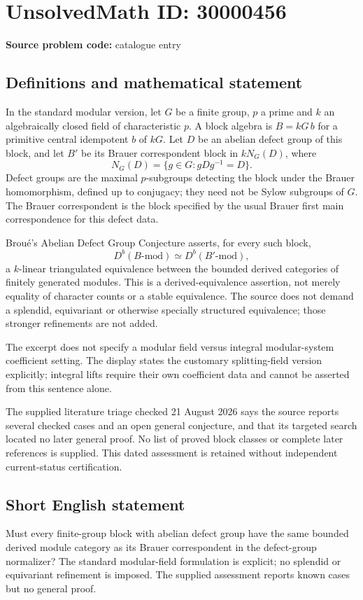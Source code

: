 \documentclass[11pt]{article}
\begin{document}
\section*{UnsolvedMath ID: 30000456}
\textbf{Source problem code:} catalogue entry
\subsection{Definitions and mathematical statement}
In the standard modular version, let $G$ be a finite group, $p$ a prime and $k$ an algebraically closed field of characteristic $p$. A block algebra is $B=kG\,b$ for a primitive central idempotent $b$ of $kG$. Let $D$ be an abelian defect group of this block, and let $B'$ be its Brauer correspondent block in $kN_G(D)$, where
\[
 N_G(D)=\{g\in G:gDg^{-1}=D\}.
\]
Defect groups are the maximal $p$-subgroups detecting the block under the Brauer homomorphism, defined up to conjugacy; they need not be Sylow subgroups of $G$. The Brauer correspondent is the block specified by the usual Brauer first main correspondence for this defect data.

Brou\'e's Abelian Defect Group Conjecture asserts, for every such block,
\[
 D^b(B\text{-}\mathrm{mod})\simeq D^b(B'\text{-}\mathrm{mod}),
\]
a $k$-linear triangulated equivalence between the bounded derived categories of finitely generated modules. This is a derived-equivalence assertion, not merely equality of character counts or a stable equivalence. The source does not demand a splendid, equivariant or otherwise specially structured equivalence; those stronger refinements are not added.

The excerpt does not specify a modular field versus integral modular-system coefficient setting. The display states the customary splitting-field version explicitly; integral lifts require their own coefficient data and cannot be asserted from this sentence alone.

The supplied literature triage checked 21 August 2026 says the source reports several checked cases and an open general conjecture, and that its targeted search located no later general proof. No list of proved block classes or complete later references is supplied. This dated assessment is retained without independent current-status certification.
\subsection{Short English statement}
Must every finite-group block with abelian defect group have the same bounded derived module category as its Brauer correspondent in the defect-group normalizer? The standard modular-field formulation is explicit; no splendid or equivariant refinement is imposed. The supplied assessment reports known cases but no general proof.
\end{document}
